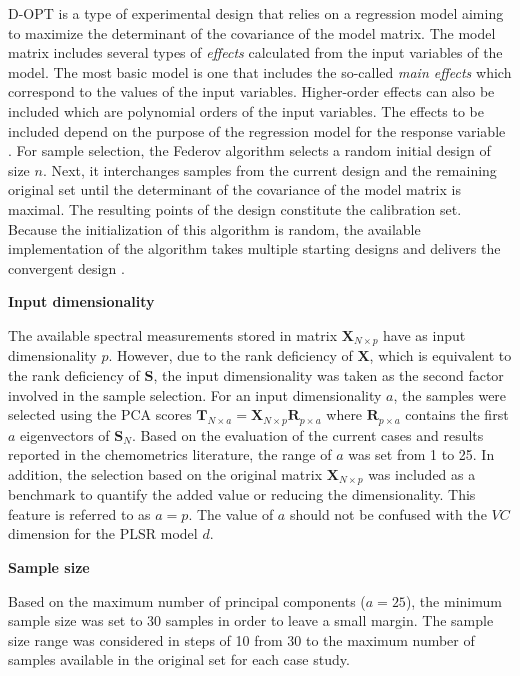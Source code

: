 \documentclass[journal=ancham,manuscript=article]{achemso}
\begin{document}
D-OPT is a type of experimental design that relies on a regression model aiming to maximize the determinant of the covariance of the model matrix. The model matrix includes several types of \emph{effects} calculated from the input variables of the model. The most basic model is one that includes the so-called \emph{main effects} which correspond to the values of the input variables. Higher-order effects can also be included which are polynomial orders of the input variables. The effects to be included depend on the purpose of the regression model for the response variable \cite{Goos2011}. For sample selection, the Federov algorithm selects a random initial design of size $n$. Next, it interchanges samples from the current design and the remaining original set until the determinant of the covariance of the model matrix is maximal. The resulting points of the design constitute the calibration set. Because the initialization of this algorithm is random, the available implementation of the algorithm takes multiple starting designs and delivers the convergent design \cite{Wheeler2019}.


\textbf{Input dimensionality}

The available spectral measurements stored in matrix $\mathbf{X}_{N\times p}$ have as input dimensionality $p$. However, due to the rank deficiency of $\mathbf{X}$, which is equivalent to the rank deficiency of $\mathbf{S}$, the input dimensionality was taken as the second factor involved in the sample selection. For an input dimensionality $a$, the samples were selected using the PCA scores $\mathbf{T}_{N\times a} = \mathbf{X}_{N\times p}\mathbf{R}_{p\times a}$ where $\mathbf{R}_{p\times a}$ contains the first $a$ eigenvectors of $\mathbf{S}_N$. Based on the evaluation of the current cases and results reported in the chemometrics literature, the range of $a$ was set from 1 to 25. In addition, the selection based on the original matrix $\mathbf{X}_{N\times p}$ was included as a benchmark to quantify the added value or reducing the dimensionality. This feature is referred to as $a=p$. The value of $a$ should not be confused with the $VC$ dimension for the PLSR model $d$. 

\textbf{Sample size}

Based on the maximum number of principal components ($a=25$), the minimum sample size was set to 30 samples in order to leave a small margin. The sample size range was considered in steps of 10 from 30 to the maximum number of samples available in the original set for each case study. 
\end{document}

